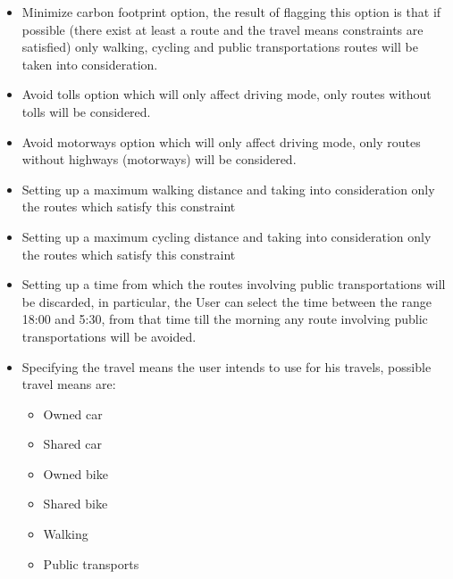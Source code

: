 \begin{itemize}
\item Minimize carbon footprint option, the result of flagging this option is that if possible (there exist at least a route and the travel means constraints are satisfied) only walking, cycling and public transportations routes will be taken into consideration.
\item Avoid tolls option which will only affect driving mode, only routes without tolls will be considered.
\item Avoid motorways option which will only affect driving mode, only routes without highways (motorways) will be considered.
\item Setting up a maximum walking distance and taking into consideration only the routes which satisfy this constraint
\item Setting up a maximum cycling distance and taking into consideration only the routes which satisfy this constraint
\item Setting up a time from which the routes involving public transportations will be discarded, in particular, the User can select the time between the range 18:00 and 5:30, from that time till the morning any route involving public transportations will be avoided.
\item Specifying the travel means the user intends to use for his travels, possible travel means are: \begin{itemize}
\item Owned car
\item Shared car
\item Owned bike
\item Shared bike
\item Walking
\item Public transports
\end{itemize}
\end{itemize}

